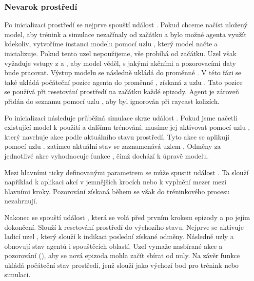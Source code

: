\newpage

\subsubsection{Nevarok prostředí}
Po inicializaci prostředí se nejprve spouští událost . Pokud chceme načíst uložený model, aby trénink a simulace nezačínaly od začátku a bylo možné agenta využít kdekoliv, vytvoříme instanci modelu pomocí uzlu , který model načte a inicializuje. Pokud tento uzel nepoužijeme, vše probíhá od začátku. Uzel však vyžaduje vstupy z  a , aby model věděl, s jakými akčními a pozorovacími daty bude pracovat. Výstup modelu se následně ukládá do proměnné . V této fázi se také ukládá počáteční pozice agenta do proměnné , získaná z uzlu . Tato pozice se používá při resetování prostředí na začátku každé epizody. Agent je zároveň přidán do seznamu  pomocí uzlu , aby byl ignorován při raycast kolizích.

Po inicializaci následuje průběžná simulace skrze událost . Pokud jsme načetli existující model k použití a dalšímu trénování, musíme jej aktivovat pomocí uzlu , který navrhuje akce podle aktuálního stavu prostředí. Tyto akce se aplikují pomocí uzlu , zatímco aktuální stav se zaznamenává uzlem . Odměny za jednotlivé akce vyhodnocuje funkce , čímž dochází k úpravě modelu.

Mezi hlavními ticky definovanými parametrem  se může spustit událost . Ta slouží například k aplikaci akcí v jemnějších krocích nebo k vyplnění mezer mezi hlavními kroky. Pozorování získaná během  se však do tréninkového procesu nezahrnují.

Nakonec se spouští událost , která se volá před prvním krokem epizody a po jejím dokončení. Slouží k resetování prostředí do výchozího stavu. Nejprve se aktivuje ladicí uzel , který slouží k indikaci poslední získané odměny. Následně uzly  a  obnovují stav agentů i spouštěcích oblastí. Uzel  vymaže nasbírané akce a pozorování (), aby se nová epizoda mohla začít sbírat od nuly. Na závěr funkce  ukládá počáteční stav prostředí, jenž slouží jako výchozí bod pro trénink nebo simulaci.

